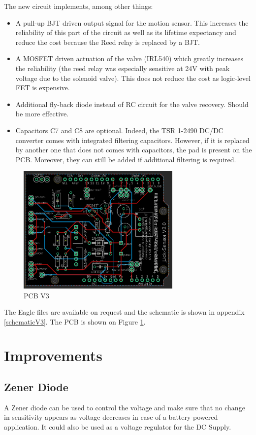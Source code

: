 \documentclass[a4paper]{article}
\begin{document}
The new circuit implements, among other things:
\begin{itemize}
    \item A pull-up BJT driven output signal for the motion sensor. This increases the reliability of this part of the circuit as well as its lifetime expectancy and reduce the cost because the Reed relay is replaced by a BJT.
    \item A MOSFET driven actuation of the valve (IRL540) which greatly increases the reliability (the reed relay was especially sensitive at 24V with peak voltage due to the solenoid valve). This does not reduce the cost as logic-level FET is expensive.
    \item Additional fly-back diode instead of RC circuit for the valve recovery. Should be more effective.
    \item Capacitors C7 and C8 are optional. Indeed, the TSR 1-2490 DC/DC converter comes with integrated filtering capacitors. However, if it is replaced by another one that does not comes with capacitors, the pad is present on the PCB. Moreover, they can still be added if additional filtering is required.
\end{itemize}

\begin{figure}[h!t!b!]
    \centering
    \includegraphics[width = 8cm]{images/BoardViewV3.PNG}
    \caption{PCB V3}
    \label{fig:PCBV3}
\end{figure}

The Eagle files are available on request and the schematic is shown in appendix \ref{schematicV3}.
The PCB is shown on Figure \ref{fig:PCBV3}.

\section{Improvements}
\subsection{Zener Diode}
A Zener diode can be used to control the voltage and make sure that no change in sensitivity appears as voltage decreases in case of a battery-powered application. It could also be used as a voltage regulator for the DC Supply.
\end{document}
